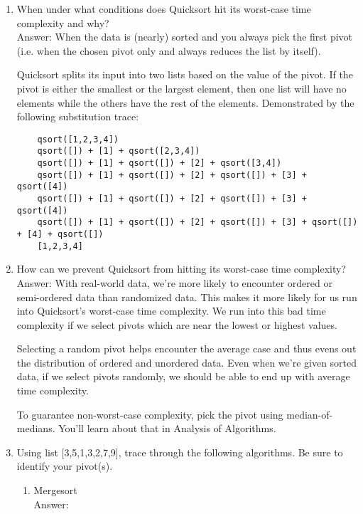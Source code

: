 \documentclass[11pt]{article}
\newenvironment{answer}{\large\lstset{basicstyle=\large\ttfamily}\color{white} \small{Answer:}}{}
\newenvironment{answer}{\large\lstset{basicstyle=\large\ttfamily}\color{red} \small{Answer:}}{}
\begin{document}
\begin{enumerate}
\item When under what conditions does Quicksort hit its worst-case time complexity and why? \\
\begin{answer}
When the data is (nearly) sorted and you always pick the first pivot (i.e. when the chosen pivot only and always reduces the list by itself).

Quicksort splits its input into two lists based on the value of the pivot.  If the pivot is either the smallest or the largest element, then one list will have no elements while the others have the rest of the elements. Demonstrated by the following substitution trace:
	\begin{verbatim}
	qsort([1,2,3,4])
	qsort([]) + [1] + qsort([2,3,4])
	qsort([]) + [1] + qsort([]) + [2] + qsort([3,4])
	qsort([]) + [1] + qsort([]) + [2] + qsort([]) + [3] + qsort([4])
	qsort([]) + [1] + qsort([]) + [2] + qsort([]) + [3] + qsort([4])
	qsort([]) + [1] + qsort([]) + [2] + qsort([]) + [3] + qsort([]) + [4] + qsort([])
	[1,2,3,4]
	\end{verbatim}
\end{answer}



\item How can we prevent Quicksort from hitting its worst-case time complexity? \\
\begin{answer}
With real-world data, we're more likely to encounter ordered or semi-ordered data than randomized data. This makes it more likely for us run into Quicksort's worst-case time complexity. We run into this bad time complexity if we select pivots which are near the lowest or highest values.

Selecting a random pivot helps encounter the average case and thus evens out the distribution of ordered and unordered data. Even when we're given sorted data, if we select pivots randomly, we should be able to end up with average time complexity.

To guarantee non-worst-case complexity, pick the pivot using median-of-medians.  You'll learn about that in Analysis of Algorithms.
\end{answer}


\item Using list [3,5,1,3,2,7,9], trace through the following algorithms.  Be sure to identify your pivot(s). \\
\begin{enumerate}
	\item Mergesort \\
	\begin{answer}


\end{answer}
\end{enumerate}
\end{enumerate}
\end{document}
